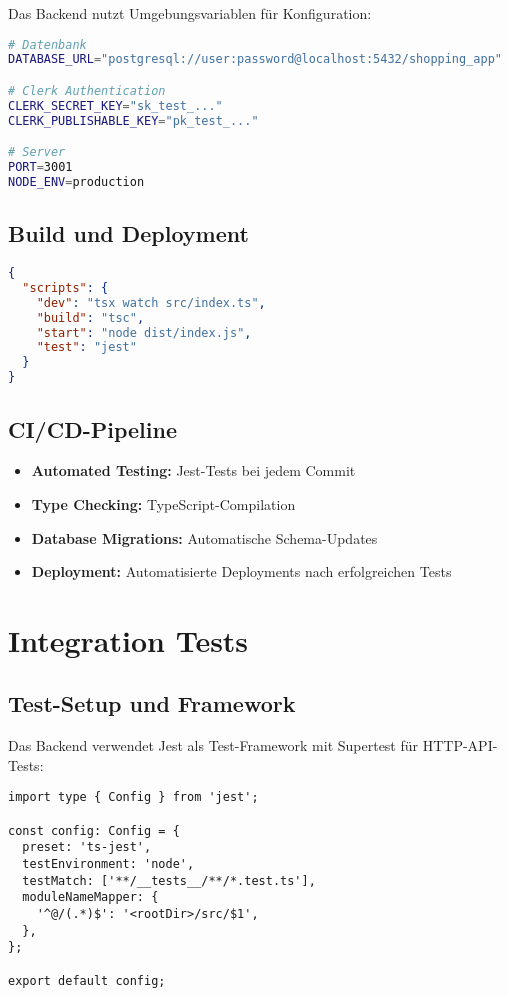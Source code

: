 Das Backend nutzt Umgebungsvariablen für Konfiguration:

\begin{lstlisting}[language=bash,caption={Umgebungsvariablen}]
# Datenbank
DATABASE_URL="postgresql://user:password@localhost:5432/shopping_app"

# Clerk Authentication
CLERK_SECRET_KEY="sk_test_..."
CLERK_PUBLISHABLE_KEY="pk_test_..."

# Server
PORT=3001
NODE_ENV=production
\end{lstlisting}

\subsection{Build und Deployment}

\begin{lstlisting}[language=json,caption={Package.json Scripts}]
{
  "scripts": {
    "dev": "tsx watch src/index.ts",
    "build": "tsc",
    "start": "node dist/index.js",
    "test": "jest"
  }
}
\end{lstlisting}

\subsection{CI/CD-Pipeline}

\begin{itemize}
    \item \textbf{Automated Testing:} Jest-Tests bei jedem Commit
    \item \textbf{Type Checking:} TypeScript-Compilation
    \item \textbf{Database Migrations:} Automatische Schema-Updates
    \item \textbf{Deployment:} Automatisierte Deployments nach erfolgreichen Tests
\end{itemize}

\section{Integration Tests}

\subsection{Test-Setup und Framework}

Das Backend verwendet Jest als Test-Framework mit Supertest für HTTP-API-Tests:

\begin{lstlisting}[style=typescriptstyle,caption={Jest-Konfiguration}]
import type { Config } from 'jest';

const config: Config = {
  preset: 'ts-jest',
  testEnvironment: 'node',
  testMatch: ['**/__tests__/**/*.test.ts'],
  moduleNameMapper: {
    '^@/(.*)$': '<rootDir>/src/$1',
  },
};

export default config;
\end{lstlisting}

